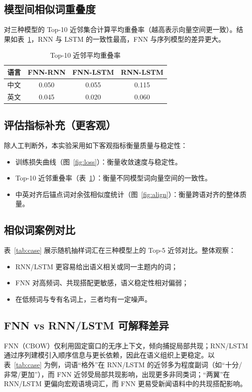 \documentclass[11pt]{article}
\begin{document}
\subsection{模型间相似词重叠度}
对三种模型的 Top-10 近邻集合计算平均重叠率（越高表示向量空间更一致）。结果如表~\ref{tab:overlap}，RNN 与 LSTM 的一致性最高，FNN 与序列模型的差异更大。

\begin{table}[H]
    \centering
    \caption{Top-10 近邻平均重叠率}
    \begin{tabular}{lccc}
        \toprule
        语言 & FNN-RNN & FNN-LSTM & RNN-LSTM \\
        \midrule
        中文 & 0.050 & 0.055 & 0.115 \\
        英文 & 0.045 & 0.020 & 0.060 \\
        \bottomrule
    \end{tabular}
    \label{tab:overlap}
\end{table}

\subsection{评估指标补充（更客观）}
除人工判断外，本实验采用如下客观指标衡量质量与稳定性：
\begin{itemize}
    \item 训练损失曲线（图~\ref{fig:loss}）：衡量收敛速度与稳定性。
    \item Top-10 近邻重叠率（表~\ref{tab:overlap}）：衡量不同模型词向量空间的一致性。
    \item 中英对齐后锚点词对余弦相似度统计（图~\ref{fig:align}）：衡量跨语对齐的整体质量。
\end{itemize}

\subsection{相似词案例对比}
表~\ref{tab:case} 展示随机抽样词汇在三种模型上的 Top-5 近邻对比。整体观察：
\begin{itemize}
    \item RNN/LSTM 更容易给出语义相关或同一主题内的词；
    \item FNN 对高频词、共现搭配更敏感，语义稳定性相对偏弱；
    \item 在低频词与专有名词上，三者均有一定噪声。
\end{itemize}

\subsection{FNN vs RNN/LSTM 可解释差异}
FNN（CBOW）仅利用固定窗口的无序上下文，倾向捕捉局部共现；RNN/LSTM 通过序列建模引入顺序信息与更长依赖，因此在语义组织上更稳定。以表~\ref{tab:case} 为例，词语“格外”在 RNN/LSTM 的近邻多为程度副词（如“十分/非常/更加”），而 FNN 近邻受局部共现影响，出现更多非同类词；“两翼”在 RNN/LSTM 更偏向宏观语境词汇，而 FNN 更易受新闻语料中的共现搭配影响。
\end{document}
